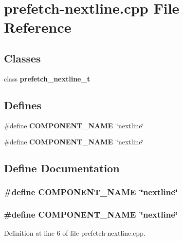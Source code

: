 \section{prefetch-nextline.cpp File Reference}
\label{prefetch-nextline_8cpp}
\subsection*{Classes}
\begin{CompactItemize}
\item 
class {\bf prefetch\_\-nextline\_\-t}
\end{CompactItemize}
\subsection*{Defines}
\begin{CompactItemize}
\item 
\#define {\bf COMPONENT\_\-NAME}~\char`\"{}nextline\char`\"{}
\item 
\#define {\bf COMPONENT\_\-NAME}~\char`\"{}nextline\char`\"{}
\end{CompactItemize}


\subsection{Define Documentation}
\subsubsection[{COMPONENT\_\-NAME}]{\setlength{\rightskip}{0pt plus 5cm}\#define COMPONENT\_\-NAME~\char`\"{}nextline\char`\"{}}\label{zesto-prefetch_8cpp_9146ade7ce24e3db226a973a59063892}


\subsubsection[{COMPONENT\_\-NAME}]{\setlength{\rightskip}{0pt plus 5cm}\#define COMPONENT\_\-NAME~\char`\"{}nextline\char`\"{}}\label{prefetch-nextline_8cpp_9146ade7ce24e3db226a973a59063892}




Definition at line 6 of file prefetch-nextline.cpp.